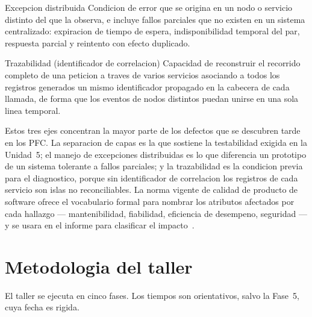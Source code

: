 \documentclass[11pt,a4paper]{article}
\begin{document}
\begin{defBox}{Excepcion distribuida}
    Condicion de error que se origina en un nodo o servicio distinto del que la observa, e incluye fallos parciales que no existen en un sistema centralizado: expiracion de tiempo de espera, indisponibilidad temporal del par, respuesta parcial y reintento con efecto duplicado.
\end{defBox}

\begin{defBox}{Trazabilidad (identificador de correlacion)}
    Capacidad de reconstruir el recorrido completo de una peticion a traves de varios servicios asociando a todos los registros generados un mismo identificador propagado en la cabecera de cada llamada, de forma que los eventos de nodos distintos puedan unirse en una sola linea temporal.
\end{defBox}

Estos tres ejes concentran la mayor parte de los defectos que se descubren tarde en los PFC.
La separacion de capas es la que sostiene la testabilidad exigida en la Unidad~5; el manejo de excepciones distribuidas es lo que diferencia un prototipo de un sistema tolerante a fallos parciales; y la trazabilidad es la condicion previa para el diagnostico, porque sin identificador de correlacion los registros de cada servicio son islas no reconciliables.
La norma vigente de calidad de producto de software ofrece el vocabulario formal para nombrar los atributos afectados por cada hallazgo --- mantenibilidad, fiabilidad, eficiencia de desempeno, seguridad --- y se usara en el informe para clasificar el impacto~\cite{ISO25010:2023}.

\section{Metodologia del taller}

El taller se ejecuta en cinco fases. Los tiempos son orientativos, salvo la Fase~5, cuya fecha es rigida.
\end{document}
